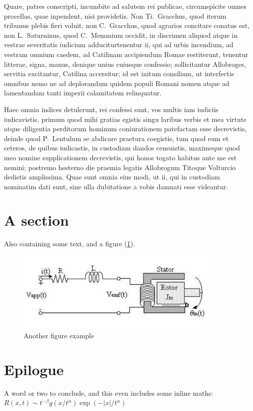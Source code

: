 \documentclass[a4paper,12pt,twoside,swedish]{report}
\begin{document}
Quare, patres conscripti, incumbite ad salutem rei publicae,
circumspicite omnes procellas, quae inpendent, nisi providetis. Non
Ti.~Gracchus, quod iterum tribunus plebis fieri voluit, non
C.~Gracchus, quod agrarios concitare conatus est, non L.~Saturninus,
quod C.~Memmium occidit, in discrimen aliquod atque in vestrae
severitatis iudicium adduciturtenentur ii, qui ad urbis incendium, ad
vestram omnium caedem, ad Catilinam accipiendum Romae restiterunt,
tenentur litterae, signa, manus, denique unius cuiusque confessio;
sollicitantur Allobroges, servitia excitantur, Catilina accersitur; id
est initum consilium, ut interfectis omnibus nemo ne ad deplorandum
quidem populi Romani nomen atque ad lamentandam tanti imperii
calamitatem relinquatur.

Haec omnia indices detulerunt, rei confessi sunt, vos multis iam iudiciis
iudicavistis, primum quod mihi gratias egistis singu laribus verbis et
mea virtute atque diligentia perditorum hominum coniurationem patefactam
esse decrevistis, deinde quod P.~Lentulum se abdicare praetura
coegistis, tum quod eum et ceteros, de quibus iudicastis, in custodiam
dandos censuistis, maximeque quod meo nomine supplicationem decrevistis,
qui honos togato habitus ante me est nemini; postremo hesterno die
praemia legatis Allobrogum Titoque Volturcio dedistis amplissima. Quae
sunt omnia eius modi, ut ii, qui in custodiam nominatim dati sunt, sine
ulla dubitatione a vobis damnati esse videantur.

\section{A section}
Also containing some text, and a figure (\ref{fig:plot_result}).
\begin{figure}
 \begin{center}
   \includegraphics[width=10cm]{Figures/dcmotor.jpg}  
  \end{center}
\caption{Another figure example}
   \label{fig:plot_result}
\end{figure}

\section{Epilogue}
A word or two to conclude,  and this even includes some
inline maths: \(R(x,t)\sim
t^{-\beta}g(x/t^\alpha)\exp(-|x|/t^\alpha)\)
\end{document}
